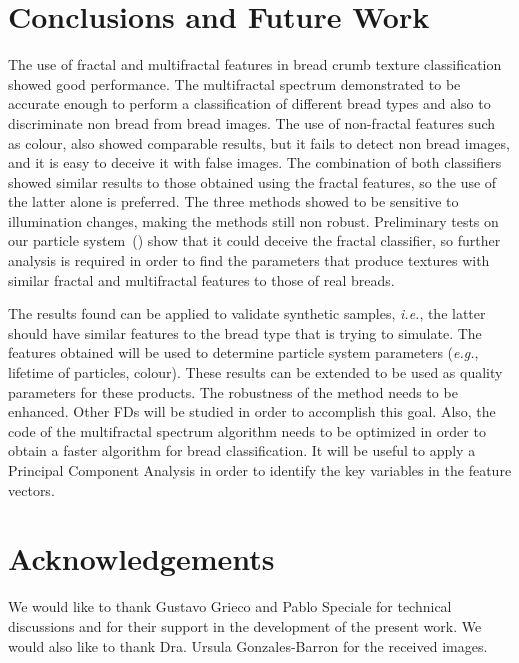 \documentclass[oneside,a4paper,english,links]{amca}
\begin{document}
\section{Conclusions and Future Work}
The use of fractal and multifractal features in bread crumb texture classification showed good performance. The multifractal spectrum demonstrated to be accurate enough to perform a classification of different bread types and also to discriminate non bread from bread images. The use of non-fractal features such as colour, also showed comparable results, but it fails to detect non bread images, and it is easy to deceive it with false images. The combination of both classifiers showed similar results to those obtained using the fractal features, so the use of the latter alone is preferred. The three methods showed to be sensitive to illumination changes, making the methods still non robust. Preliminary tests on our particle system~(\cite{Baravalle2011}) show that it could deceive the fractal classifier, so further analysis is required in order to find the parameters that produce textures with similar fractal and multifractal features to those of real breads.

The results found can be applied to validate synthetic samples, {\em i.e.}, the latter should have similar features to the bread type that is trying to simulate. The features obtained will be used to determine particle system parameters ({\em e.g.}, lifetime of particles, colour). These results can be extended to be used as quality parameters for these products. The robustness of the method needs to be enhanced. Other FDs will be studied in order to accomplish this goal. Also, the code of the multifractal spectrum algorithm needs to be optimized in order to obtain a faster algorithm for bread classification. It will be useful to apply a Principal Component Analysis in order to identify the key variables in the feature vectors. 

\section{Acknowledgements}
We would like to thank Gustavo Grieco and Pablo Speciale for technical discussions and for their support in the development of the present work. We would also like to thank Dra. Ursula Gonzales-Barron for the received images.

%

\end{document}
